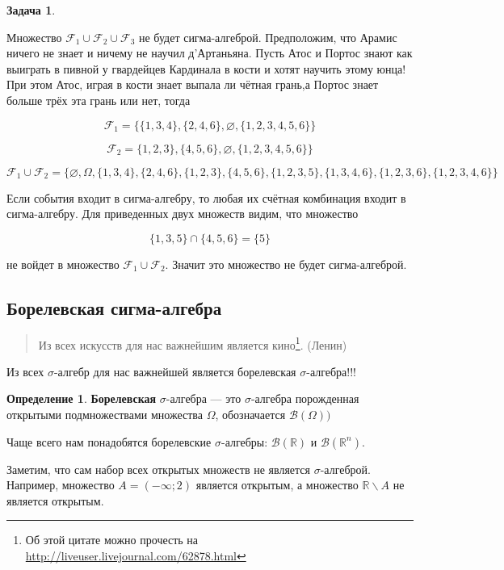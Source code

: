 \documentclass[pdftex, 12pt, a4paper]{article}
\def\R{\ensuremath{\mathbb{R}}} %
\def\F{\ensuremath{\mathcal{F}}} %
\def \Om{\Omega}
\theoremstyle{definition} %
\newtheorem*{mydef}{Определение}
\newtheorem{problem}{Задача}
\numberwithin{problem}{section}
\newcommand{\indef}[1]{\textbf{#1}}
\numberwithin{blits}{section}
\begin{document}
\begin{problem}
\begin{sol}
Множество $\F_1 \cup \F_2 \cup \F_3$ не будет сигма-алгеброй. Предположим, что Арамис ничего не знает и ничему не научил д'Артаньяна. Пусть Атос и Портос знают как выиграть в пивной у гвардейцев Кардинала в кости и хотят научить этому юнца! При этом Атос, играя в кости знает выпала ли чётная грань,а Портос знает больше трёх эта грань или нет, тогда

\[\F_1 = \{ \{1,3,4\},\{2,4,6\},\varnothing,\{1,2,3,4,5,6\}\} \]

\[\F_2 = \{1,2,3\},\{4,5,6\},\varnothing,\{1,2,3,4,5,6\}\}\]

\[\F_1 \cup \F_2 = \{\varnothing,\Om,\{1,3,4\},\{2,4,6\},\{1,2,3\},\{4,5,6\},\{1,2,3,5\},\{1,3,4,6\},\{1,2,3,6\},\{1,2,3,4,6\}\} \]

Если события входит в сигма-алгебру, то любая их счётная комбинация входит в сигма-алгебру. Для приведенных двух множеств видим, что множество 

\[\{1,3,5\} \cap \{4,5,6\} = \{5\} \]

не войдет в множество $\F_1 \cup \F_2$. Значит это множество не будет сигма-алгеброй.

\end{sol}
\end{problem}



\subsection{Борелевская сигма-алгебра}

\begin{quote}
Из всех искусств для нас важнейшим является кино\footnote{Об этой цитате можно прочесть на \url{http://liveuser.livejournal.com/62878.html}}. (Ленин)
\end{quote}


Из всех $\sigma$-алгебр для нас важнейшей является борелевская $\sigma$-алгебра!!!


\begin{mydef} \indef{Борелевская} $\sigma$-алгебра --- это $\sigma$-алгебра порожденная открытыми подмножествами множества $\Omega$, обозначается $\mathcal{B}(\Om))$
\end{mydef}

Чаще всего нам понадобятся борелевские $\sigma$-алгебры: $\mathcal{B}(\mathbb{R})$ и $\mathcal{B}(\mathbb{R}^{n})$.

Заметим, что сам набор всех открытых множеств не является $\sigma$-алгеброй. Например, множество $A=(-\infty;2)$ является
открытым, а множество $\R\backslash A$ не является открытым.
\end{document}
